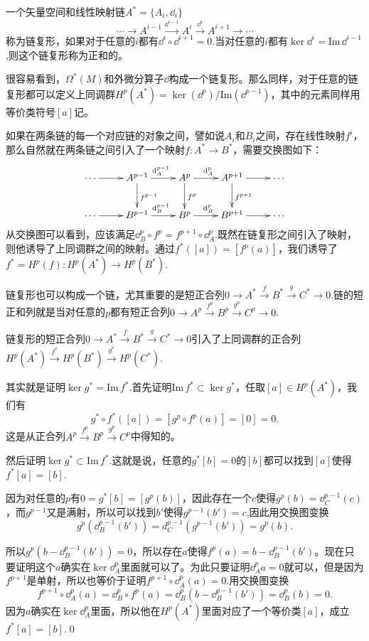 一个矢量空间和线性映射链$A^*=\{A_i,\dd_i\}$
\[
	\cdots\to A^{i-1}\xrightarrow{\dd^{i-1}}A^i\xrightarrow{\dd^i}A^{i+1}\to \cdots
\]
称为链复形，如果对于任意的$i$都有$\dd^i \circ \dd^{i+1}=0$.当对任意的$i$都有$\ker \dd^i=\mathrm{Im}\, \dd^{i-1}$,则这个链复形称为正和的。

\para 很容易看到，$\Omega^*(M)$和外微分算子$\dd$构成一个链复形。那么同样，对于任意的链复形都可以定义上同调群$H^p(A^*)=\ker (\dd^p)/\mathrm{Im} (\dd^{p-1})$，其中的元素同样用等价类符号$[a]$记。

\para 如果在两条链的每一个对应链的对象之间，譬如说$A_i$和$B_i$之间，存在线性映射$f^i$，那么自然就在两条链之间引入了一个映射$f:A^*\to B^*$，需要交换图如下：
	\[
	\xymatrix{
		\cdots\ar[r]&A^{p-1}\ar[r]^{\dd_A^{p-1}}\ar[d]^{f^{p-1}}&A^p\ar[r]^{\dd_A^p}\ar[d]^{f^{p}}&A^{p+1}\ar[r]\ar[d]^{f^{p+1}}&\cdots\\
		\cdots\ar[r]&B^{p-1}\ar[r]^{\dd_B^{p-1}}&B^p\ar[r]^{\dd_B^p}&B^{p+1}\ar[r]&\cdots
	}
	\]
从交换图可以看到，应该满足$\dd^{p}_B\circ f^p=f^{p+1}\circ \dd^{p}_A$.既然在链复形之间引入了映射，则他诱导了上同调群之间的映射。通过$f^*([a])=[f^p(a)]$，我们诱导了$f^*=H^p(f):H^p(A^*)\to H^p(B^*)$.

\para 链复形也可以构成一个链，尤其重要的是短正合列$0\to A^*\xrightarrow{f}B^*\xrightarrow{g}C^*\to 0$.链的短正和列就是当对任意的$p$都有短正合列$0\to A^p\xrightarrow{f^p}B^p\xrightarrow{g^p}C^p\to 0$.

\pro 链复形的短正合列$0\to A^*\xrightarrow{f}B^*\xrightarrow{g}C^*\to 0$引入了上同调群的正合列$H^p(A^*)\xrightarrow{f^*}H^p(B^*)\xrightarrow{g^*}H^p(C^*)$.

\proof 其实就是证明$\ker g^*=\mathrm{Im}\, f^*$.首先证明$\mathrm{Im}\, f^* \subset \ker g^*$，任取$[a]\in H^p(A^*)$，我们有
\[
g^*\circ f^*([a])=[g^p\circ f^p(a)]=[0]=0.
\]
这是从正合列$A^p\xrightarrow{f^p}B^p\xrightarrow{g^p}C^p$中得知的。

然后证明$\ker g^*\subset \mathrm{Im}\, f^*$.这就是说，任意的$g^*[b]=0$的$[b]$都可以找到$[a]$使得$f^*[a]=[b]$.

因为对任意的$p$有$0=g^*[b]=[g^p(b)]$，因此存在一个$c$使得$g^p(b)=\dd^{p-1}_C(c)$，而$g^{p-1}$又是满射，所以可以找到$b'$使得$g^{p-1}(b')=c$,因此用交换图变换
\[
g^p(\dd^{p-1}_B(b'))=d^{p-1}_C(g^{p-1}(b'))=g^p(b).
\]

所以$g^p(b-\dd^{p-1}_B(b'))=0$，所以存在$a$使得$f^p(a)=b-\dd^{p-1}_B(b')$。现在只要证明这个$a$确实在$\ker \dd^p_A$里面就可以了。为此只要证明$\dd^p_A a=0$就可以，但是因为$f^{p+1}$是单射，所以也等价于证明$f^{p+1}\circ \dd^p_A (a)=0$.用交换图变换
\[
f^{p+1}\circ \dd^p_A (a)=\dd^p_B\circ f^p (a)=\dd^p_B(b-\dd^{p-1}_B(b'))=\dd^p_B(b)=0.
\]
因为$a$确实在$\ker \dd^p_A$里面，所以他在$H^p(A^*)$里面对应了一个等价类$[a]$，成立$f^*[a]=[b]$.\qed

